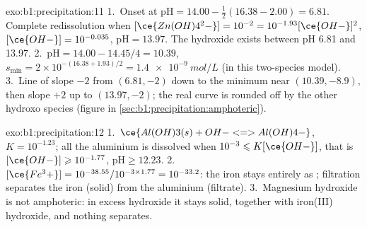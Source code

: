 \begin{solution}{exo:b1:precipitation:11}
1.~Onset at $\mathrm{pH} = 14.00 - \frac12(16.38 - 2.00) = 6.81$. Complete
redissolution when $[\ce{Zn(OH)4^2-}] = 10^{-2} = 10^{-1.93}[\ce{OH-}]^2$,
$[\ce{OH-}] = 10^{-0.035}$, $\mathrm{pH} = 13.97$. The hydroxide exists
between pH 6.81 and 13.97.
2.~$\mathrm{pH} = 14.00 - 14.45/4 = 10.39$, $s_{\min} = 2 \times
10^{-(16.38 + 1.93)/2} = \qty{1.4e-9}{mol/L}$ (in this two-species model).
3.~Line of slope $-2$ from $(6.81, -2)$ down to the minimum near
$(10.39, -8.9)$, then slope $+2$ up to $(13.97, -2)$; the real curve is
rounded off by the other hydroxo species
(figure in \cref{sec:b1:precipitation:amphoteric}).
\end{solution}

\begin{solution}{exo:b1:precipitation:12}
1.~$\ce{Al(OH)3(s) + OH- <=> Al(OH)4-}$, $K = 10^{-1.23}$; all the
aluminium is dissolved when $10^{-3} \leqslant K[\ce{OH-}]$, that is
$[\ce{OH-}] \geqslant 10^{-1.77}$, $\mathrm{pH} \geqslant 12.23$.
2.~$[\ce{Fe^3+}] = 10^{-38.55}/10^{-3 \times 1.77} = 10^{-33.2}$: the iron
stays entirely as ; filtration separates the iron (solid)
from the aluminium (filtrate).
3.~Magnesium hydroxide is not amphoteric: in excess hydroxide it stays
solid, together with iron(III) hydroxide, and nothing separates.
\end{solution}

